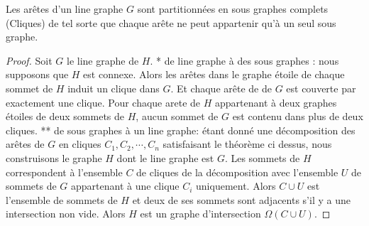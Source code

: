 \begin{theorem}
Les ar\^etes d'un line graphe $G$ sont partitionn\'ees en sous graphes complets (Cliques) de tel sorte que chaque ar\^ete ne peut appartenir qu'\`a un seul sous graphe.
\end{theorem}
\begin{proof}
Soit $G$ le line graphe de $H$. \newline
* de line graphe \`a des sous graphes :
nous supposons que $H$ est connexe.
Alors les ar\^etes dans le graphe \'etoile de chaque sommet de $H$ induit un clique dans $G$. Et chaque ar\^ete de de $G$ est couverte par exactement une clique. 
Pour chaque arete de $H$ appartenant \`a deux graphes \'etoiles de deux sommets de $H$, aucun sommet de $G$ est contenu dans plus de deux cliques. \newline
** de sous graphes \`a un line graphe:
\'etant donn\'e une d\'ecomposition des ar\^etes de $G$ en cliques $C_1, C_2,\cdots, C_n$ satisfaisant le th\'eor\`eme ci dessus, nous construisons le graphe $H$ dont le line graphe est $G$.
Les sommets de $H$ correspondent \`a l'ensemble $C$ de cliques de la d\'ecomposition   avec l'ensemble $U$ de sommets de $G$ appartenant \`a une clique $C_i$ uniquement.
Alors $C \cup U$ est l'ensemble de sommets de $H$ et deux de ses sommets sont adjacents s'il y a une intersection non vide. Alors $H$ est un graphe d'intersection $\Omega(C \cup U)$.
\end{proof}

